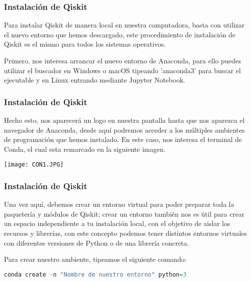 \documentclass[spanish]{beamer}
\begin{document}
\begin{frame}[fragile]\frametitle{Instalación de Qiskit}
\justify\setlength{\parskip}{5mm}
Para instalar Qiskit de manera local en nuestra computadora, basta con utilizar el nuevo entorno que hemos descargado, este procedimiento de instalación de Qiskit es el mismo para todos los sistemas operativos.

Primero, nos interesa arrancar el nuevo entorno de Anaconda, para ello puedes utilizar el buscador en Windows o macOS tipeando 'anaconda3' para buscar el ejecutable y en Linux entrando mediante Jupyter Notebook.
\end{frame}
\begin{frame}[fragile]\frametitle{Instalación de Qiskit}
\justify\setlength{\parskip}{5mm}
Hecho esto, nos aparecerá un logo en nuestra pantalla hasta que nos aparezca el navegador de Anaconda, desde aquí podremos acceder a los múltiples ambientes de programación que hemos instalado. En este caso, nos interesa el terminal de Conda, el cual esta remarcado en la siguiente imagen.

\centering\texttt{[image: CON1.JPG]}

\end{frame}
\begin{frame}[fragile]\frametitle{Instalación de Qiskit}
\justify\setlength{\parskip}{5mm}
Una vez aquí, debemos crear un entorno virtual para poder preparar toda la paquetería y módulos de Qiskit; crear un entorno también nos es útil para crear un espacio independiente a tu instalación local, con el objetivo de aislar los recursos y librerías, con este concepto podemos tener distintos entornos virtuales con diferentes versiones de Python o de una librería concreta.

Para crear nuestro ambiente, tipeamos el siguiente comando:
\begin{lstlisting}[language=c++]
conda create -n "Nombre de nuestro entorno" python=3\end{lstlisting}
\end{frame}
\end{document}
